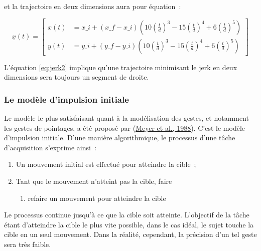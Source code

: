 \documentclass[
]{book}
\providecommand{\tightlist}{%
  \setlength{\itemsep}{0pt}\setlength{\parskip}{0pt}}
\begin{document}
et la trajectoire en deux dimensions aura pour
équation~:

\begin{equation} \underline{x}(t)=\left[\begin{array}{cc} x(t)
 &
 =x\_{i}+\left(x\_{f}-x\_{i}\right)\left(10\left(\frac{t}{d}\right)^{3}-15\left(\frac{t}{d}\right)^{4}+6\left(\frac{t}{d}\right)^{5}\right)\\
 y(t) &
 =y\_{i}+\left(y\_{f}-y\_{i}\right)\left(10\left(\frac{t}{d}\right)^{3}-15\left(\frac{t}{d}\right)^{4}+6\left(\frac{t}{d}\right)^{5}\right)\end{array}\right]
 \label{eq:jerk2}
\end{equation}

L'équation \eqref{eq:jerk2} implique qu'une trajectoire minimisant le jerk
en deux dimensions sera toujours un segment de droite.

\hypertarget{le-moduxe8le-dimpulsion-initiale}{%
\subsubsection{Le modèle d'impulsion initiale}\label{le-moduxe8le-dimpulsion-initiale}}

Le modèle le plus satisfaisant quant à la modélisation des gestes, et
notamment les gestes de pointages, a été proposé par (\protect\hyperlink{ref-meyer1988optimality}{Meyer et al., 1988}). C'est le modèle
d'impulsion initiale. D'une manière algorithmique, le processus d'une tâche
d'acquisition s'exprime ainsi~:

\begin{enumerate}
\def\labelenumi{\arabic{enumi}.}
\tightlist
\item
  Un mouvement initial est effectué pour atteindre
  la cible~;
\item
  Tant que le mouvement n'atteint pas la cible,
  faire

  \begin{enumerate}
  \def\labelenumii{\arabic{enumii}.}
  \tightlist
  \item
    refaire un mouvement pour atteindre la
    cible
  \end{enumerate}
\end{enumerate}

Le processus continue jusqu'à ce que la cible soit atteinte. L'objectif de
la tâche étant d'atteindre la cible le plus vite possible, dans le cas idéal,
le sujet touche la cible en un seul mouvement. Dans la réalité, cependant, la
précision d'un tel geste sera très faible.
\end{document}
